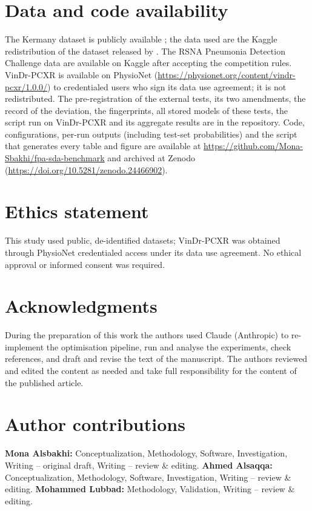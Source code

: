 \documentclass[10pt,letterpaper]{article}
\begin{document}
\section*{Data and code availability}
The Kermany dataset is publicly available \citep{kaggle2018cxr,kermany2018}; the data used are the Kaggle redistribution of the dataset released by \citet{kermany2018}. The RSNA Pneumonia Detection Challenge data \citep{shih2019rsna} are available on Kaggle after accepting the competition rules. VinDr-PCXR \citep{pham2023pedicxr} is available on PhysioNet (\url{https://physionet.org/content/vindr-pcxr/1.0.0/}) to credentialed users who sign its data use agreement; it is not redistributed. The pre-registration of the external tests, its two amendments, the record of the deviation, the fingerprints, all stored models of these tests, the script run on VinDr-PCXR and its aggregate results are in the repository. Code, configurations, per-run outputs (including test-set probabilities) and the script that generates every table and figure are available at \url{https://github.com/Mona-Sbakhi/fpa-sda-benchmark} and archived at Zenodo (\url{https://doi.org/10.5281/zenodo.24466902}).

\section*{Ethics statement}
This study used public, de-identified datasets; VinDr-PCXR was obtained through PhysioNet credentialed access under its data use agreement. No ethical approval or informed consent was required.

\section*{Acknowledgments}
During the preparation of this work the authors used Claude (Anthropic) to re-implement the optimisation pipeline, run and analyse the experiments, check references, and draft and revise the text of the manuscript. The authors reviewed and edited the content as needed and take full responsibility for the content of the published article.

\section*{Author contributions}
\textbf{Mona Alsbakhi:} Conceptualization, Methodology, Software, Investigation, Writing -- original draft, Writing -- review \& editing. \textbf{Ahmed Alsaqqa:} Conceptualization, Methodology, Software, Investigation, Writing -- review \& editing. \textbf{Mohammed Lubbad:} Methodology, Validation, Writing -- review \& editing.
\end{document}
